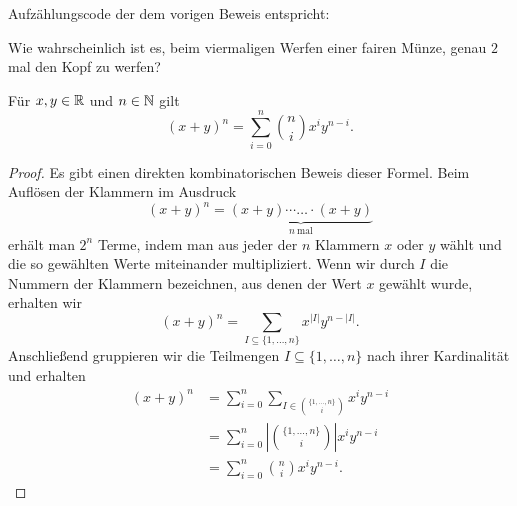 \begin{bem} Aufzählungscode der dem vorigen Beweis entspricht: 

\end{bem} 

\begin{aufg}
	Wie wahrscheinlich ist es, beim viermaligen Werfen einer fairen Münze, genau $2$ mal den Kopf zu werfen?
\end{aufg} 



\begin{thm}[Binomialsatz] 
	Für $x, y \in \mathbb{R}$ und $n \in \mathbb{N}$ gilt 
	\[
			(x+y)^n = \sum_{i=0}^n \binom{n}{i} x^i y^{n-i}. 
	\]
\end{thm} 
\begin{proof}
	Es gibt einen direkten kombinatorischen Beweis dieser Formel. Beim Auflösen der Klammern im Ausdruck 
	\[
			(x+y)^n = \underbrace{(x+y) \cdots \ldots \cdot (x+y)}_{n \ \text{mal}}
	\]
	erhält man $2^n$ Terme, indem man aus jeder der $n$ Klammern $x$ oder $y$ wählt und die so gewählten Werte miteinander multipliziert. Wenn wir durch $I$ die Nummern der Klammern bezeichnen, aus denen der Wert $x$ gewählt wurde, erhalten wir 
	\[
			(x+y)^n = \sum_{I \subseteq \{1,\ldots,n\}} x^{|I|} y^{n - |I|}. 
	\]
	Anschließend gruppieren wir die Teilmengen $I \subseteq \{1,\ldots,n\}$ nach ihrer Kardinalität und erhalten
	\begin{align*}
			(x+y)^n & =\sum_{i=0}^n \sum_{I \in \binom{\{1,\ldots,n\}}{i}} x^i y^{n-i} 
			\\ & = \sum_{i=0}^n \left| \binom{\{1,\ldots,n\}}{i} \right| x^i y^{n-i} 
			\\ & = \sum_{i=0}^n \binom{n}{i}  x^i y^{n-i}.
	\end{align*} 
\end{proof} 

